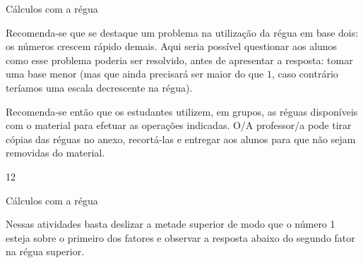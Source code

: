 \begin{sugestions}{Cálculos com a régua}
{
	Recomenda-se que se destaque um problema na utilização da régua em base dois: os números crescem rápido demais. Aqui seria possível questionar aos alunos como esse problema poderia ser resolvido, antes de apresentar a resposta: tomar uma base menor (mas que ainda precisará ser maior do que $1$, caso contrário teríamos uma escala decrescente na régua).

Recomenda-se então que os estudantes utilizem, em grupos, as réguas disponíveis com o material para efetuar as operações indicadas. O/A professor/a pode tirar cópias das réguas no anexo, recortá-las e entregar aos alunos para que não sejam removidas do material.
}{1}{2}
\end{sugestions}
\begin{answer}{Cálculos com a régua}
{
	Nessas atividades basta deslizar a metade superior de modo que o número 1 esteja sobre o primeiro dos fatores e observar a resposta abaixo do segundo fator na régua superior.

}
\end{answer}
